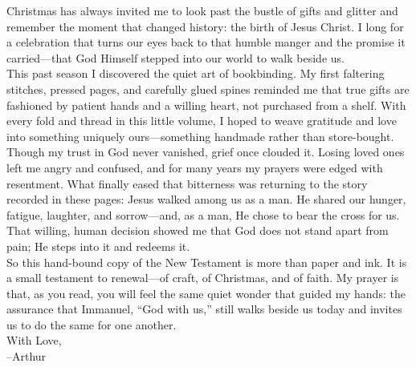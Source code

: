 \begin{flushleft}
  \vspace*{\fill}
  Christmas has always invited me to look past the bustle of gifts and glitter and remember the moment that changed history: the birth of Jesus Christ.  I long for a celebration that turns our eyes back to that humble manger and the promise it carried—that God Himself stepped into our world to walk beside us.\\
\medskip
This past season I discovered the quiet art of bookbinding.  My first faltering stitches, pressed pages, and carefully glued spines reminded me that true gifts are fashioned by patient hands and a willing heart, not purchased from a shelf.  With every fold and thread in this little volume, I hoped to weave gratitude and love into something uniquely ours—something handmade rather than store-bought.\\
\medskip
Though my trust in God never vanished, grief once clouded it.  Losing loved ones left me angry and confused, and for many years my prayers were edged with resentment.  What finally eased that bitterness was returning to the story recorded in these pages: Jesus walked among us as a man.  He shared our hunger, fatigue, laughter, and sorrow—and, as a man, He chose to bear the cross for us.  That willing, human decision showed me that God does not stand apart from pain; He steps into it and redeems it.\\
\medskip
So this hand-bound copy of the New Testament is more than paper and ink.  It is a small testament to renewal—of craft, of Christmas, and of faith.  My prayer is that, as you read, you will feel the same quiet wonder that guided my hands: the assurance that Immanuel, “God with us,” still walks beside us today and invites us to do the same for one another.\\
  \bigskip
With Love, \\
  \medskip
--Arthur
  \vspace*{\fill}
\end{flushleft}
\newpage
